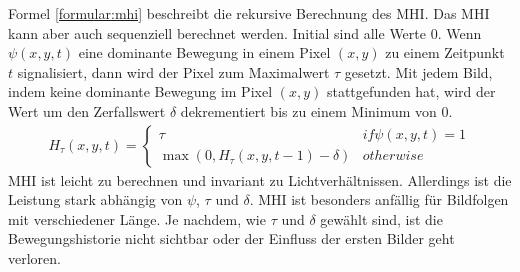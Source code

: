 \newline
\newline
Formel \ref{formular:mhi} beschreibt die rekursive Berechnung des MHI. Das MHI kann aber auch sequenziell berechnet werden. Initial sind alle Werte 0. Wenn $\psi(x,y,t)$ eine dominante Bewegung in einem Pixel $(x,y)$
zu einem Zeitpunkt $t$ signalisiert, dann wird der Pixel zum Maximalwert $\tau$ gesetzt. Mit jedem Bild, indem keine dominante Bewegung im Pixel $(x,y)$ stattgefunden hat, wird der Wert um den
Zerfallswert $\delta$ dekrementiert bis zu einem Minimum von 0.
\begin{align}
    H_{\tau}(x,y,t) = \begin{cases}
                          \tau & if \psi(x,y,t) = 1 \\
                          \max(0, H_{\tau}(x,y,t-1) - \delta) & otherwise
    \end{cases}
    \label{formular:mhi}
\end{align}
MHI ist leicht zu berechnen und invariant zu Lichtverhältnissen. Allerdings ist die Leistung stark abhängig von $\psi$, $\tau$ und $\delta$. MHI ist besonders anfällig für Bildfolgen mit verschiedener Länge.
Je nachdem, wie $\tau$ und $\delta$ gewählt sind, ist die Bewegungshistorie nicht sichtbar oder der Einfluss der ersten Bilder geht verloren.